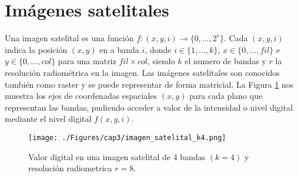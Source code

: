 \section{Im\'agenes satelitales}

Una imagen satelital es una funci\'on $ f:(x,y,i) \longrightarrow \{0,...,2^{r}\} $. Cada $ (x,y,i) $ indica la posici\'on $ (x,y) $ en a banda $ i $, donde $ i \in \{1,...,k\} $, $ x \in \{0,...,fil\} $ e $ y \in \{0,...,col\} $ para una matriz $ fil \times col $, siendo $ k $ el numero de bandas y $ r $ la resoluci\'on radiom\'etrica en la imagen. Las im\'agenes satelitales son conocidos tambi\'en como raster \cite{vasquez2011mineria} y se puede representar de forma matricial. La Figura \ref{fig:imagenMultiespectral} nos muestra los ejes de coordenadas espaciales $ (x,y) $ para cada plano que representan las bandas, pudiendo acceder a valor de la intensidad o nivel digital mediante el nivel digital  $ f(x,y,i) $.
  \begin{figure}[H]
  	\centering
  	\texttt{[image: ./Figures/cap3/imagen\_satelital\_k4.png]}
  	\caption{Valor digital en una imagen satelital de 4 bandas $ (k=4) $ y resoluci\'on radiometrica $ r=8 $.}
  	\label{fig:imagenMultiespectral}
  \end{figure}



